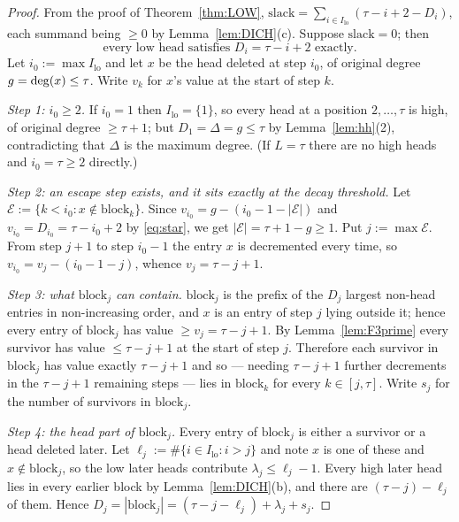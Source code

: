 \begin{proof}
From the proof of Theorem~\ref{thm:LOW},
$\mathrm{slack} = \sum_{i \in I_{\mathrm{lo}}}(\tau - i + 2 - D_i)$, each summand being
$\ge 0$ by Lemma~\ref{lem:DICH}(c). Suppose $\mathrm{slack} = 0$; then
\begin{equation}\label{eq:star}
\text{every low head satisfies } D_i = \tau - i + 2 \text{ exactly.}
\tag{$*$}
\end{equation}
Let $i_0 := \max I_{\mathrm{lo}}$ and let $x$ be the head deleted at step $i_0$, of original
degree $g = \mathrm{deg}(x) \le \tau$. Write $v_k$ for $x$'s value at the start of step $k$.

\emph{Step 1: $i_0 \ge 2$.} If $i_0 = 1$ then $I_{\mathrm{lo}} = \{1\}$, so every head at a
position $2,\dots,\tau$ is high, of original degree $\ge \tau+1$; but
$D_1 = \Delta = g \le \tau$ by Lemma~\ref{lem:hh}(2), contradicting that $\Delta$ is the
maximum degree. (If $L = \tau$ there are no high heads and $i_0 = \tau \ge 2$ directly.)

\emph{Step 2: an escape step exists, and it sits exactly at the decay threshold.} Let
$\mathcal{E} := \{k < i_0 : x \notin \mathrm{block}_k\}$. Since
$v_{i_0} = g - (i_0 - 1 - |\mathcal{E}|)$ and $v_{i_0} = D_{i_0} = \tau - i_0 + 2$ by
\eqref{eq:star}, we get $|\mathcal{E}| = \tau + 1 - g \ge 1$. Put $j := \max \mathcal{E}$.
From step $j+1$ to step $i_0-1$ the entry $x$ is decremented every time, so
$v_{i_0} = v_j - (i_0-1-j)$, whence $v_j = \tau - j + 1$.

\emph{Step 3: what $\mathrm{block}_j$ can contain.} $\mathrm{block}_j$ is the prefix of the
$D_j$ largest non-head entries in non-increasing order, and $x$ is an entry of step $j$
lying outside it; hence every entry of $\mathrm{block}_j$ has value $\ge v_j = \tau-j+1$. By
Lemma~\ref{lem:F3prime} every survivor has value $\le \tau-j+1$ at the start of step $j$.
Therefore each survivor in $\mathrm{block}_j$ has value exactly $\tau-j+1$ and so --- needing
$\tau-j+1$ further decrements in the $\tau-j+1$ remaining steps --- lies in
$\mathrm{block}_k$ for every $k \in [j,\tau]$. Write $s_j$ for the number of survivors in
$\mathrm{block}_j$.

\emph{Step 4: the head part of $\mathrm{block}_j$.} Every entry of $\mathrm{block}_j$ is
either a survivor or a head deleted later. Let $\ell_j := \#\{i \in I_{\mathrm{lo}} : i > j\}$
and note $x$ is one of these and $x \notin \mathrm{block}_j$, so the low later heads
contribute $\lambda_j \le \ell_j - 1$. Every high later head lies in every earlier block by
Lemma~\ref{lem:DICH}(b), and there are $(\tau-j)-\ell_j$ of them. Hence
$D_j = |\mathrm{block}_j| = (\tau-j-\ell_j) + \lambda_j + s_j$.


\end{proof}
